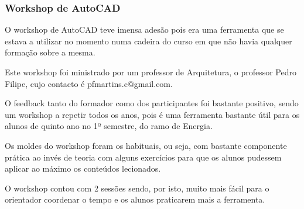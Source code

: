
\subsubsection{Workshop de AutoCAD}

O workshop de AutoCAD teve imensa adesão pois era uma ferramenta que se estava a utilizar no momento numa cadeira do curso em que não havia qualquer formação sobre a mesma.

Este workshop foi ministrado por um professor de Arquitetura, o professor Pedro Filipe, cujo contacto é pfmartins.c@gmail.com.

O feedback tanto do formador como dos participantes foi bastante positivo, sendo um workshop a repetir todos os anos, pois é uma ferramenta bastante útil para os alunos de quinto ano no 1º semestre, do ramo de Energia.

Os moldes do workshop foram os habituais, ou seja, com bastante componente prática ao invés de teoria com alguns exercícios para que os alunos pudessem aplicar ao máximo os conteúdos lecionados.

O workshop contou com 2 sessões sendo, por isto, muito mais fácil para o orientador coordenar o tempo e os alunos praticarem mais a ferramenta. 
